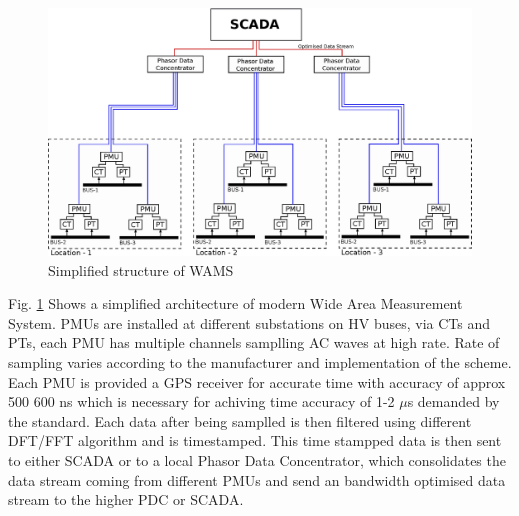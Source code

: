 \begin{figure}
	\includegraphics[width=\textwidth]{fig/wams.eps}
	\caption{Simplified structure of WAMS}
	\label{fig:wams}
\end{figure}

Fig. \ref{fig:wams} Shows a simplified architecture of modern Wide Area Measurement System. PMUs are installed at different substations on HV buses, via CTs and PTs, each PMU has multiple channels samplling AC waves at high rate. Rate of sampling varies according to the manufacturer and implementation of the scheme. Each PMU is provided a GPS receiver for accurate time with accuracy of approx 500 600 ns which is necessary for achiving time accuracy of 1-2 $\mu$s demanded by the standard. Each data after being samplled is then filtered using different DFT/FFT algorithm and is timestamped. This time stampped data is then sent to either SCADA or to a local Phasor Data Concentrator, which consolidates the data stream coming from different PMUs and send an bandwidth optimised data stream to the higher PDC or SCADA. 

